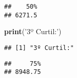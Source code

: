 \documentclass[runningheads,a4paper]{llncs}
\newenvironment{Shaded}{}{}
\newcommand{\KeywordTok}[1]{\textcolor[rgb]{0.00,0.44,0.13}{\textbf{{#1}}}}
\newcommand{\DecValTok}[1]{\textcolor[rgb]{0.25,0.63,0.44}{{#1}}}
\newcommand{\StringTok}[1]{\textcolor[rgb]{0.25,0.44,0.63}{{#1}}}
\newcommand{\NormalTok}[1]{{#1}}
\newcommand{\OperatorTok}[1]{\textcolor[rgb]{0.40,0.40,0.40}{{#1}}}
\begin{document}
\begin{verbatim}
##    50% 
## 6271.5
\end{verbatim}

\begin{Shaded}
\begin{Highlighting}[]
\KeywordTok{print}\NormalTok{(}\StringTok{'3º Curtil:'}\NormalTok{)}
\end{Highlighting}
\end{Shaded}

\begin{verbatim}
## [1] "3º Curtil:"
\end{verbatim}

\begin{Shaded}
\end{Shaded}

\begin{verbatim}
##     75% 
## 8948.75
\end{verbatim}
\end{document}
